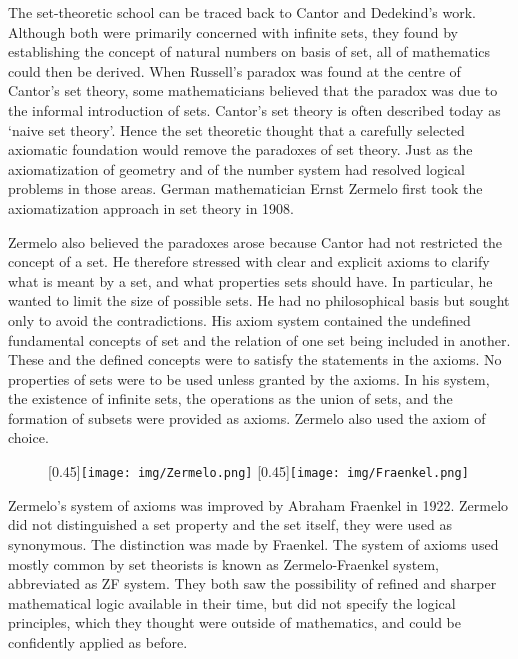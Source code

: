 \documentclass{article}
\begin{document}
The set-theoretic school can be traced back to Cantor and Dedekind's work. Although both were primarily concerned with infinite sets, they found by establishing the concept of natural numbers on basis of set, all of mathematics could then be derived. When Russell's paradox was found at the centre of Cantor's set theory, some mathematicians believed that the paradox was due to the informal introduction of sets. Cantor's set theory is often described today as `naive set theory'. Hence the set theoretic thought that a carefully selected axiomatic foundation would remove the paradoxes of set theory. Just as the axiomatization of geometry and of the number system had resolved logical problems in those areas. German mathematician Ernst Zermelo first took the axiomatization approach in set theory in 1908.

Zermelo also believed the paradoxes arose because Cantor had not restricted the concept of a set. He therefore stressed with clear and explicit axioms to clarify what is meant by a set, and what properties sets should have. In particular, he wanted to limit the size of possible sets. He had no philosophical basis but sought only to avoid the contradictions. His axiom system contained the undefined fundamental concepts of set and the relation of one set being included in another. These and the defined concepts were to satisfy the statements in the axioms. No properties of sets were to be used unless granted by the axioms. In his system, the existence of infinite sets, the operations as the union of sets, and the formation of subsets were provided as axioms. Zermelo also used the axiom of choice\cite{M-Kline-2007}.

\begin{figure}[htbp]
  \centering
  [0.45\linewidth]{\texttt{[image: img/Zermelo.png]}} \quad
  [0.45\linewidth]{\texttt{[image: img/Fraenkel.png]}}
  \captionsetup{labelformat=empty}
  \caption{}
  \label{fig:Zermelo-and-Fraenkel}
\end{figure}

 
Zermelo's system of axioms was improved by Abraham Fraenkel in 1922. Zermelo did not distinguished a set property and the set itself, they were used as synonymous. The distinction was made by Fraenkel. The system of axioms used mostly common by set theorists is known as Zermelo-Fraenkel system, abbreviated as ZF system. They both saw the possibility of refined and sharper mathematical logic available in their time, but did not specify the logical principles, which they thought were outside of mathematics, and could be confidently applied as before\cite{M-Kline-2007}.
\end{document}
